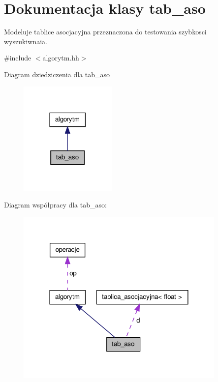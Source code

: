 \hypertarget{classtab__aso}{\section{\-Dokumentacja klasy tab\-\_\-aso}
\label{classtab__aso}
}


\-Modeluje tablice asocjacyjna przeznaczona do testowania szybkosci wyszukiwnaia.  




{\ttfamily \#include $<$algorytm.\-hh$>$}



\-Diagram dziedziczenia dla tab\-\_\-aso\nopagebreak
\begin{figure}[H]
\begin{center}
\leavevmode
\includegraphics[width=134pt]{classtab__aso__inherit__graph}
\end{center}
\end{figure}


\-Diagram współpracy dla tab\-\_\-aso\-:\nopagebreak
\begin{figure}[H]
\begin{center}
\leavevmode
\includegraphics[width=290pt]{classtab__aso__coll__graph}
\end{center}
\end{figure}
